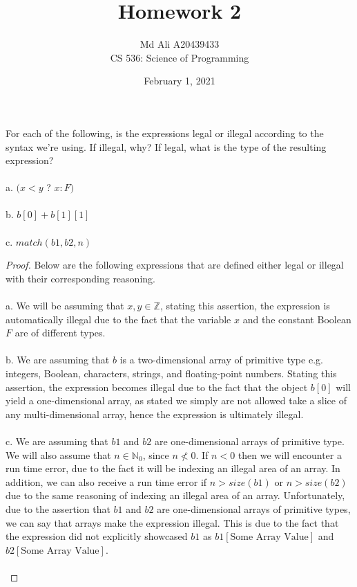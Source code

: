 \documentclass[12pt]{article}
\newenvironment{exercise}[2][Exercise]{\begin{trivlist}
\item[\hskip \labelsep {\bfseries #1}\hskip \labelsep {\bfseries #2.}]}{\end{trivlist}}
\begin{document}
 
\title{Homework 2}
\author{Md Ali A20439433 \\ 
CS 536: Science of Programming} 
\date{February 1, 2021}

\maketitle
 
\begin{exercise}{1}
For each of the following, is the expressions legal or illegal according to the syntax we're using. If illegal, why? If legal, what is the type of the resulting expression? \\ \\ 
a. $(x < y$ ? $x : F)$ \\ \\ 
b. $b[0] + b[1][1]$ \\ \\
c. $match(b1,b2,n)$
\end{exercise} 

\begin{proof}
Below are the following expressions that are defined either legal or illegal with their corresponding reasoning. \\ \\
a. We will be assuming that $x,y \in \mathbb{Z}$, stating this assertion, the expression is automatically illegal due to the fact that the variable $x$ and the constant Boolean $F$ are of different types. \\ \\
b. We are assuming that $b$ is a two-dimensional array of primitive type e.g. integers, Boolean, characters, strings, and floating-point numbers. Stating this assertion, the expression becomes illegal due to the fact that the object $b[0]$ will yield a one-dimensional array, as stated we simply are not allowed take a slice of any multi-dimensional array, hence the expression is ultimately illegal. \\ \\ 
c. We are assuming that $b1$ and $b2$ are one-dimensional arrays of primitive type. We will also assume that $n \in \mathbb{N}_{0}$, since $n \not < 0$. If $n < 0$ then we will encounter a run time error, due to the fact it will be indexing an illegal area of an array. In addition, we can also receive a run time error if $n > size(b1)$ or $n > size(b2)$ due to the same reasoning of indexing an illegal area of an array. Unfortunately, due to the assertion that $b1$ and $b2$ are one-dimensional arrays of primitive types, we can say that arrays make the expression illegal. This is due to the fact that the expression did not explicitly showcased $b1$ as $b1[\text{Some Array Value}]$ and $b2[\text{Some Array Value}]$. \\ \\
\end{proof}
\end{document}

